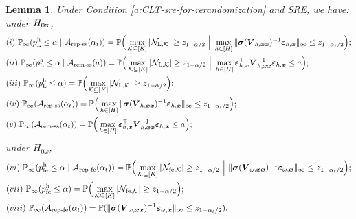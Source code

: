 \documentclass[12pt]{article}
\newtheorem{lemma}{Lemma}
\newcommand{\hpfe}{p_\textnormal{fe}^{\textnormal{h}}}
\newcommand{\Lin}{\textnormal{L}}
\newcommand{\Prob}{\mathbb{P}}
\newcommand{\mk}{\mathcal{K}}
\newcommand{\ma}{\mathcal{A}}
\newcommand{\remss}{\textnormal{rem-ss}}
\newcommand{\repss}{\textnormal{rep-ss}}
\newcommand{\repfe}{\textnormal{rep-fe}}
\newcommand{\fe}{\textnormal{fe}}
\newcommand{\bs}{\boldsymbol}
\newcommand{\hpL}{p_\textnormal{L}^{\textnormal{h}}}
\begin{document}
\begin{lemma}
\label{lem:asymptotic-limit-of-type-I-error-rate}
Under Condition \ref{a:CLT-sre-for-rerandomization} and SRE, we have: under $H_{0\textsc{n}}$,
    \begin{align*}
        &(i)~\Prob_{\infty}(\hpL \leq \alpha\mid \ma_{\repss}(\alpha_t))  =  \Prob\Big( \max_{\mk \subseteq [K]}|\mathcal{N}_{\Lin,\mk}| \geq z_{1-\alpha/2} ~\Big | ~ \max_{h \in [H]}\|\bs{\sigma}(\bs{V}_{h,\bs{x}\bs{x}})^{-1}\bs{\varepsilon}_{h,\bs{x}}\|_{\infty} \leq z_{1-\alpha_t/2} \Big); \\
         &(ii)~\Prob_{\infty}(\hpL \leq \alpha\mid \ma_{\remss}(a))  = \Prob\Big( \max_{\mk \subseteq [K]}|\mathcal{N}_{\Lin,\mk}| \geq z_{1-\alpha/2} ~\Big | ~ \max_{h\in [H]}\bs{\varepsilon}_{h,\bs{x}}^\top \bs{V}_{h,\bs{x}\bs{x}}^{-1} \bs{\varepsilon}_{h,\bs{x}} \leq a \Big);\\
         &(iii)~\Prob_{\infty}(\hpL \leq \alpha) = \Prob\Big( \max_{\mk \subseteq [K]}|\mathcal{N}_{\Lin,\mk}| \geq z_{1-\alpha/2} \Big);\quad \\
         & (iv) ~\Prob_{\infty}(\ma_{\repss}(\alpha_t)) = \Prob\Big(\max_{h \in [H]}\|\bs{\sigma}(\bs{V}_{h,\bs{x}\bs{x}})^{-1}\bs{\varepsilon}_{h,\bs{x}}\|_{\infty} \leq z_{1-\alpha_t/2}\Big);\\
         &(v)~ \Prob_{\infty}(\ma_{\remss}(\alpha_t)) = \Prob\Big(\max_{h\in [H]}\bs{\varepsilon}_{h,\bs{x}}^\top \bs{V}_{h,\bs{x}\bs{x}}^{-1} \bs{\varepsilon}_{h,\bs{x}} \leq a \Big);
    \end{align*}
    under $H_{0\omega}$,
    \begin{align*}
     &(vi)~\Prob_{\infty}(\hpfe \leq \alpha\mid \ma_{\repfe}(\alpha_t))  = \Prob\Big( \max_{\mk \subseteq [K]}|\mathcal{N}_{\fe ,\mk}| \geq z_{1-\alpha/2} ~ \Big | ~ \|\bs{\sigma}(\bs{V}_{\omega,\bs{x}\bs{x}})^{-1}\bs{\varepsilon}_{\omega,\bs{x}}\|_{\infty} \leq z_{1-\alpha_t/2} \Big);\\
      &(vii)~\Prob_{\infty}(\hpfe \leq \alpha)  = \Prob\Big( \max_{\mk \subseteq [K]}|\mathcal{N}_{\fe ,\mk}| \geq z_{1-\alpha/2}  \Big);\\
     &(viii)~ \Prob_{\infty}(\ma_{\repfe}(\alpha_t)) = \Prob( \|\bs{\sigma}(\bs{V}_{\omega,\bs{x}\bs{x}})^{-1}\bs{\varepsilon}_{\omega,\bs{x}}\|_{\infty} \leq z_{1-\alpha_t/2}).
    \end{align*}
\end{lemma}
\end{document}
